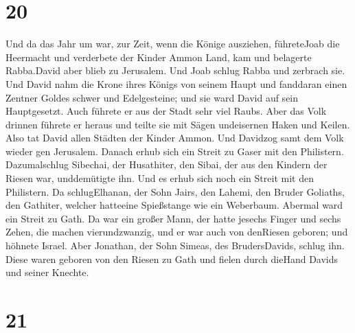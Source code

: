 \hypertarget{section-19}{%
\section{20}\label{section-19}}

 Und da das Jahr um war, zur Zeit, wenn die Könige
ausziehen, führeteJoab die Heermacht und verderbete der Kinder Ammon
Land, kam und belagerte Rabba.David aber blieb zu Jerusalem. Und Joab
schlug Rabba und zerbrach sie.  Und David nahm die Krone
ihres Königs von seinem Haupt und fanddaran einen Zentner Goldes schwer
und Edelgesteine; und sie ward David auf sein Hauptgesetzt. Auch führete
er aus der Stadt sehr viel Raubs.  Aber das Volk drinnen
führete er heraus und teilte sie mit Sägen undeisernen Haken und Keilen.
Also tat David allen Städten der Kinder Ammon. Und Davidzog samt dem
Volk wieder gen Jerusalem.  Danach erhub sich ein Streit zu
Gaser mit den Philistern. Dazumalschlug Sibechai, der Husathiter, den
Sibai, der aus den Kindern der Riesen war, unddemütigte ihn.
 Und es erhub sich noch ein Streit mit den Philistern. Da
schlugElhanan, der Sohn Jairs, den Lahemi, den Bruder Goliaths, den
Gathiter, welcher hatteeine Spießstange wie ein Weberbaum. 
Abermal ward ein Streit zu Gath. Da war ein großer Mann, der hatte
jesechs Finger und sechs Zehen, die machen vierundzwanzig, und er war
auch von denRiesen geboren;  und höhnete Israel. Aber
Jonathan, der Sohn Simeas, des BrudersDavids, schlug ihn. 
Diese waren geboren von den Riesen zu Gath und fielen durch dieHand
Davids und seiner Knechte.

\hypertarget{section-20}{%
\section{21}\label{section-20}}

